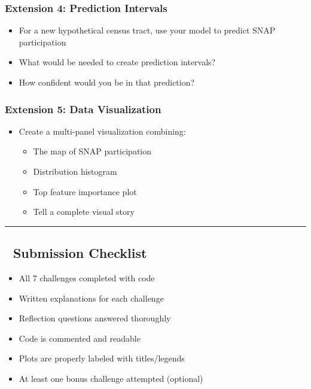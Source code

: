\documentclass[
  letterpaper,
  DIV=11,
  numbers=noendperiod]{scrartcl}
\providecommand{\tightlist}{%
  \setlength{\itemsep}{0pt}\setlength{\parskip}{0pt}}\usepackage{longtable,booktabs,array}
\begin{document}
\begin{tcolorbox}
\subsubsection{Extension 4: Prediction
Intervals}\label{extension-4-prediction-intervals}

\begin{itemize}
\tightlist
\item
  For a new hypothetical census tract, use your model to predict SNAP
  participation
\item
  What would be needed to create prediction intervals?
\item
  How confident would you be in that prediction?
\end{itemize}

\subsubsection{Extension 5: Data
Visualization}\label{extension-5-data-visualization}

\begin{itemize}
\tightlist
\item
  Create a multi-panel visualization combining:

  \begin{itemize}
  \tightlist
  \item
    The map of SNAP participation
  \item
    Distribution histogram
  \item
    Top feature importance plot
  \item
    Tell a complete visual story
  \end{itemize}
\end{itemize}

\end{tcolorbox}

\begin{center}\rule{0.5\linewidth}{0.5pt}\end{center}

\subsection{📝 Submission Checklist}\label{submission-checklist}

\begin{itemize}
\tightlist
\item[$\square$]
  All 7 challenges completed with code
\item[$\square$]
  Written explanations for each challenge
\item[$\square$]
  Reflection questions answered thoroughly
\item[$\square$]
  Code is commented and readable
\item[$\square$]
  Plots are properly labeled with titles/legends
\item[$\square$]
  At least one bonus challenge attempted (optional)
\end{itemize}
\end{document}

